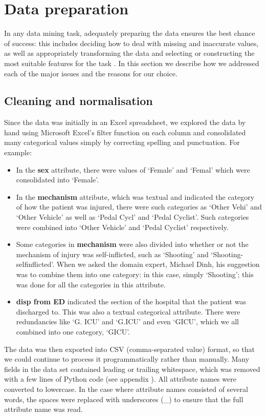\section{Data preparation}
In any data mining task, adequately preparing the data ensures the best
chance of success: this includes deciding how to deal with missing and
inaccurate values, as well as appropriately transforming the data
\citep{Witten2005} and selecting or constructing the most suitable features
for the task \citep{Kotsiantis2006}.
In this section we describe how we addressed each of
the major issues and the reasons for our choice.

\subsection{Cleaning and normalisation} %
Since the data was initially in an Excel spreadsheet, we explored the data
by hand using Microsoft Excel's filter function on each column and
consolidated many categorical values simply
by correcting spelling and punctuation. For example:
\begin{itemize}
  \item In the \textbf{sex} attribute, there were values of `Female' and
  `Femal' which were consolidated into `Female'.
  \item In the \textbf{mechanism} attribute, which was textual and indicated
  the category of how the patient was injured, there were such categories as
  `Other Vehi' and `Other Vehicle' as well as `Pedal Cycl' and `Pedal Cyclist'.
  Such categories were combined into `Other Vehicle' and `Pedal Cyclist'
  respectively.
  \item Some categories in \textbf{mechanism} were also divided into whether or
  not the mechanism of injury was self-inflicted, such as `Shooting' and
  `Shooting-selfinflicted'. When we asked the domain expert, Michael Dinh, his
  suggestion was to combine them into one category: in this case, simply
  `Shooting'; this was done for all the categories in this attribute.
  \item \textbf{disp from ED} indicated the section of the hospital that the
  patient was discharged to. This was also a textual categorical attribute.
  There were redundancies like `G. ICU' and `G.ICU' and even `GICU', which we
  all combined into one category, `GICU'.
\end{itemize}

The data was then exported into CSV (comma-separated value) format, so that
we could continue to process it programmatically rather than manually. Many
fields in the data set contained leading or trailing whitespace, which was
removed with a few lines of Python code (see appendix ). All attribute names were converted to lowercase. In the case
where attribute names consisted of several words, the spaces were replaced
with underscores (\_) to ensure that the full attribute name was read.

